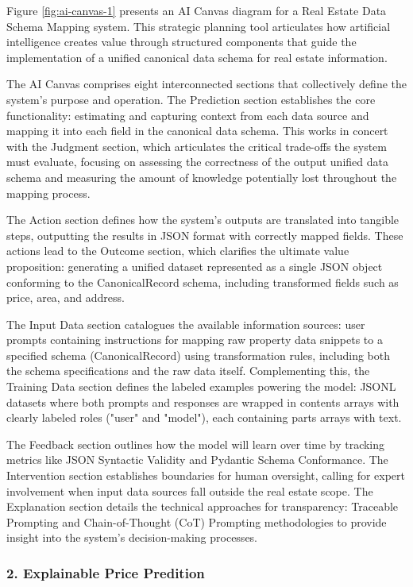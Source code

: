 \noindent Figure \ref{fig:ai-canvas-1} presents an AI Canvas diagram for a Real Estate Data Schema Mapping system. This strategic planning tool articulates how artificial intelligence creates value through structured components that guide the implementation of a unified canonical data schema for real estate information.

The AI Canvas comprises eight interconnected sections that collectively define the system's purpose and operation. The Prediction section establishes the core functionality: estimating and capturing context from each data source and mapping it into each field in the canonical data schema. This works in concert with the Judgment section, which articulates the critical trade-offs the system must evaluate, focusing on assessing the correctness of the output unified data schema and measuring the amount of knowledge potentially lost throughout the mapping process.

The Action section defines how the system's outputs are translated into tangible steps, outputting the results in JSON format with correctly mapped fields. These actions lead to the Outcome section, which clarifies the ultimate value proposition: generating a unified dataset represented as a single JSON object conforming to the CanonicalRecord schema, including transformed fields such as price, area, and address.

The Input Data section catalogues the available information sources: user prompts containing instructions for mapping raw property data snippets to a specified schema (CanonicalRecord) using transformation rules, including both the schema specifications and the raw data itself. Complementing this, the Training Data section defines the labeled examples powering the model: JSONL datasets where both prompts and responses are wrapped in contents arrays with clearly labeled roles ("user" and "model"), each containing parts arrays with text.

The Feedback section outlines how the model will learn over time by tracking metrics like JSON Syntactic Validity and Pydantic Schema Conformance. The Intervention section establishes boundaries for human oversight, calling for expert involvement when input data sources fall outside the real estate scope. The Explanation section details the technical approaches for transparency: Traceable Prompting and Chain-of-Thought (CoT) Prompting methodologies to provide insight into the system's decision-making processes.


\subsubsection{2. Explainable Price Predition}

